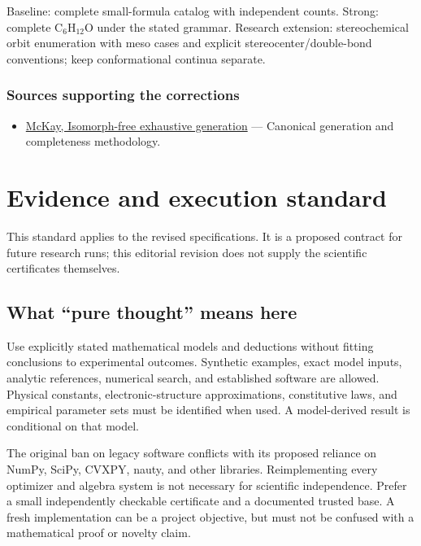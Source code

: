 \documentclass[
  11pt,
]{article}
\providecommand{\tightlist}{%
  \setlength{\itemsep}{0pt}\setlength{\parskip}{0pt}}
\begin{document}
Baseline: complete small-formula catalog with independent counts.
Strong: complete C\ensuremath{{}_{6}}H\ensuremath{{}_{12}}O under the
stated grammar. Research extension: stereochemical orbit enumeration
with meso cases and explicit stereocenter/double-bond conventions; keep
conformational continua separate.

\subsubsection{Sources supporting the corrections}

\begin{itemize}
\tightlist
\item
  \href{https://users.cecs.anu.edu.au/~bdm/papers/orderly.pdf}{McKay,
  Isomorph-free exhaustive generation} --- Canonical generation and
  completeness methodology.
\end{itemize}

\section{Evidence and execution standard}

This standard applies to the revised specifications. It is a proposed
contract for future research runs; this editorial revision does not
supply the scientific certificates themselves.

\subsection{What ``pure thought'' means here}

Use explicitly stated mathematical models and deductions without fitting
conclusions to experimental outcomes. Synthetic examples, exact model
inputs, analytic references, numerical search, and established software
are allowed. Physical constants, electronic-structure approximations,
constitutive laws, and empirical parameter sets must be identified when
used. A model-derived result is conditional on that model.

The original ban on legacy software conflicts with its proposed reliance
on NumPy, SciPy, CVXPY, nauty, and other libraries. Reimplementing every
optimizer and algebra system is not necessary for scientific
independence. Prefer a small independently checkable certificate and a
documented trusted base. A fresh implementation can be a project
objective, but must not be confused with a mathematical proof or novelty
claim.
\end{document}
